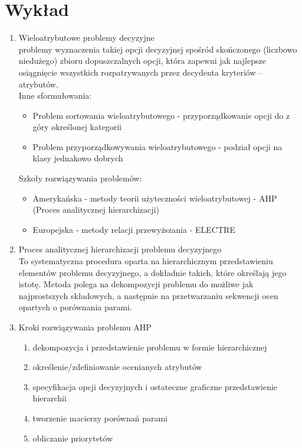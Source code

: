 \documentclass[11pt]{article}
\begin{document}
    \section{Wykład}
    \begin{enumerate}
        \item Wieloatrybutowe problemy decyzyjne \\
        problemy wyznaczenia takiej opcji decyzyjnej
        spośród skończonego (liczbowo niedużego) zbioru dopuszczalnych opcji,
        która zapewni jak najlepsze osiągnięcie wszystkich rozpatrywanych przez
        decydenta kryteriów – atrybutów.\\
        Inne sformułowania:
        \begin{itemize}
        	\item Problem sortowania wieloatrybutowego - przyporządkowanie opcji
        	do z góry określonej kategorii
        	\item Problem przyporządkowywania wieloatrybutowego - podział opcji na
        	klasy jednakowo dobrych
        \end{itemize}
        Szkoły rozwiązywania problemów:
        \begin{itemize}
        	\item Amerykańska - metody teorii użyteczności wieloatrybutowej - AHP
        	 (Proces analitycznej hierarchizacji)
        	 \item Europejska - metody relacji przewyższania - ELECTRE
        \end{itemize}
        
        \item Proces analitycznej hierarchizacji problemu decyzyjnego \\
        To systematyczna procedura oparta na hierarchicznym przedstawieniu
        elementów problemu decyzyjnego, a dokładnie takich, które określają
        jego istotę. Metoda polega na dekompozycji problemu do możliwe jak najprostszych
        składowych, a następnie na przetwarzaniu sekwencji ocen opartych 
        o porównania parami.
        
        \item Kroki rozwiązywania problemu AHP
        \begin{enumerate}
        	\item dekompozycja i przedstawienie problemu w formie hierarchicznej
        	\item określenie/zdefiniowanie ocenianych atrybutów
        	\item specyfikacja opcji decyzyjnych i ostateczne
        	graficzne przedstawienie hierarchii
        	\item tworzenie macierzy porównań parami
        	\item obliczanie priorytetów
        \end{enumerate}
        

\end{enumerate}
\end{document}
